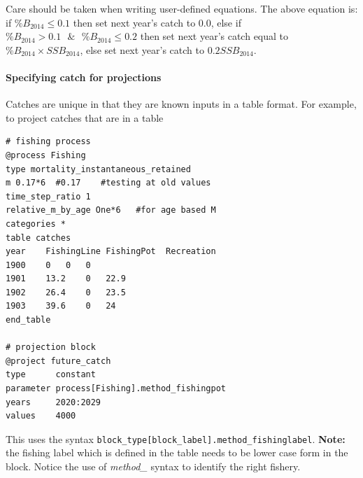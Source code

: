 Care should be taken when writing user-defined equations. The above equation is: if $\%B_{2014} \leq 0.1$ then set next year's catch to 0.0, else if $\%B_{2014} > 0.1 \text{ } \& \text{ } \%B_{2014} \leq 0.2$ then set next year's catch equal to $\%B_{2014} \times SSB_{2014}$, else set next year's catch to $0.2 SSB_{2014}$.

\paragraph[Catches]{Specifying catch for projections }\label{Projections@Catches}

Catches are unique in that they are known inputs in a table format. For example, to project catches that are in a table

{\small{\begin{verbatim}
# fishing process
@process Fishing
type mortality_instantaneous_retained
m 0.17*6  #0.17    #testing at old values
time_step_ratio 1
relative_m_by_age One*6   #for age based M
categories *
table catches
year	FishingLine	FishingPot	Recreation
1900	0	0	0
1901	13.2	0	22.9
1902	26.4	0	23.5
1903	39.6	0	24
end_table

# projection block
@project future_catch
type      constant
parameter process[Fishing].method_fishingpot
years     2020:2029
values    4000
\end{verbatim}}}

This uses the syntax \texttt{block\_type[block\_label].method\_fishinglabel}. \textbf{Note:} the fishing label which is defined in the table needs to be lower case form in the  block. Notice the use of \textit{method\_} syntax to identify the right fishery.
